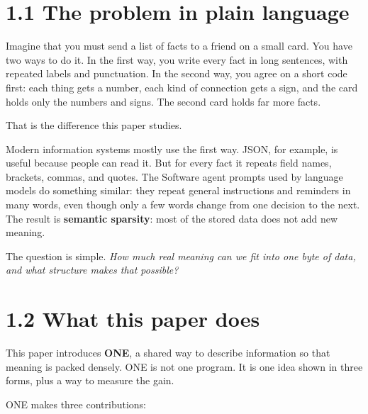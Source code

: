 \label{sec:introduction}

\section*{1.1 The problem in plain language}

Imagine that you must send a list of facts to a friend on a small card. You have two ways to do it. In the first way, you write every fact in long sentences, with repeated labels and punctuation. In the second way, you agree on a short code first: each thing gets a number, each kind of connection gets a sign, and the card holds only the numbers and signs. The second card holds far more facts.

That is the difference this paper studies.

Modern information systems mostly use the first way. JSON, for example, is useful because people can read it. But for every fact it repeats field names, brackets, commas, and quotes. The Software agent prompts used by language models do something similar: they repeat general instructions and reminders in many words, even though only a few words change from one decision to the next. The result is \textbf{semantic sparsity}: most of the stored data does not add new meaning.

The question is simple. \textit{How much real meaning can we fit into one byte of data, and what structure makes that possible?}

\section*{1.2 What this paper does}

This paper introduces \textbf{ONE}, a shared way to describe information so that meaning is packed densely. ONE is not one program. It is one idea shown in three forms, plus a way to measure the gain.

ONE makes three contributions:

